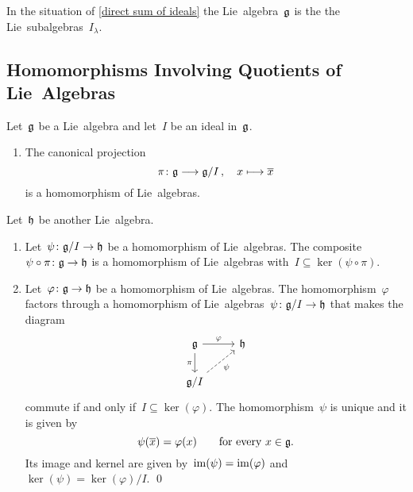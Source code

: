 \begin{definition}
  In the situation of \cref{direct sum of ideals} the Lie~algebra~$\mathfrak{g}$ is the  the Lie~subalgebras~$I_\lambda$.
\end{definition}


\subsection{Homomorphisms Involving Quotients of Lie~Algebras}


\begin{theorem}
  Let~$\mathfrak{g}$ be a Lie~algebra and let~$I$ be an ideal in~$\mathfrak{g}$.
  \begin{enumerate}
    \item
      The canonical projection
      \[
        \pi
        \colon
        \glie
        \to
        \glie/I \,,
        \quad
        x
        \mapsto
        \class{x}
      \]
      is a homomorphism of Lie~algebras.
  \end{enumerate}
  Let~$\mathfrak{h}$ be another Lie~algebra.
  \begin{enumerate}[resume*]
    \item
      Let~$\psi \colon \glie/I \to \hlie$ be a homomorphism of Lie~algebras.
      The composite~$\psi \circ \pi \colon \glie \to \hlie$ is a homomorphism of Lie~algebras with~$I \subseteq \ker(\psi \circ \pi)$.
    \item
      Let~$\varphi \colon \glie \to \hlie$ be a homomorphism of Lie~algebras.
      The homomorphism~$\varphi$ factors through a homomorphism of Lie~algebras~$\psi \colon \glie/I \to \hlie$ that makes the diagram
      \[
        \begin{tikzcd}
          \glie
          \arrow{r}[above]{\varphi}
          \arrow{d}[left]{\pi}
          &
          \hlie
          \\
          \glie/I
          \arrow[dashed]{ur}[below right]{\psi}
          &
          {}
        \end{tikzcd}
      \]
      commute if and only if~$I \subseteq \ker(\varphi)$.
      The homomorphism~$\psi$ is unique and it is given by
      \[
        \psi( \overline{x} )
        =
        \varphi(x)
        \qquad
        \text{for every~$x \in \mathfrak{g}$.}
      \]
      Its image and kernel are given by~$\operatorname{im}(\psi) = \operatorname{im}(\varphi)$ and~$\ker(\psi) = \ker(\varphi)/I$.
    \qed
  \end{enumerate}
\end{theorem}


